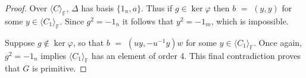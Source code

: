 \documentclass[10pt,a4paper]{amsart}
\begin{document}
\begin{proof}
 Over $\langle C \rangle_\mathbb{F}$, $\Delta$ has basis
 $\{ 1_n, a\}$.
 Thus if 
% 
 $g \in \ker \varphi$ then $b$ $=$ 
 $(y, y)$ for some
 $y\in \langle C_1\rangle_\mathbb{F}$. Since $g^2 = -1_n$
 it follows that $y^2 = -1_m$,
 which is impossible.

 Suppose $g \notin \ker \varphi$, so that
 $b$ $=$ $(u y ,-u^{-1} y)w$ for some 
 $y \in \langle C_1\rangle_\mathbb{F}$.
 Once again, $g^2 = -1_n$ implies 
 $\langle C_1\rangle_\mathbb{F}$ has an element
 of order 4. This final contradiction proves that $G$ is primitive. 
\end{proof}
\end{document}
